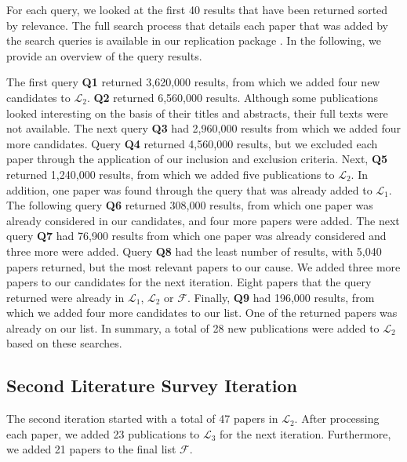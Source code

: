 For each query, we looked at the first 40 results that have been returned sorted by relevance. The full search process that details each paper that was added by the search queries is available in our replication package \cite{schneider_replication_2025}. In the following, we provide an overview of the query results.

The first query \textbf{Q1} returned 3,620,000 results, from which we added four new candidates to $\mathcal{L}_2$. \textbf{Q2} returned 6,560,000 results. Although some publications looked interesting on the basis of their titles and abstracts, their full texts were not available. The next query \textbf{Q3} had 2,960,000 results from which we added four more candidates. Query \textbf{Q4} returned 4,560,000 results, but we excluded each paper through the application of our inclusion and exclusion criteria. Next, \textbf{Q5} returned 1,240,000 results, from which we added five publications to $\mathcal{L}_2$. In addition, one paper was found through the query that was already added to $\mathcal{L}_1$. The following query \textbf{Q6} returned 308,000 results, from which one paper was already considered in our candidates, and four more papers were added. The next query \textbf{Q7} had 76,900 results from which one paper was already considered and three more were added. Query \textbf{Q8} had the least number of results, with 5,040 papers returned, but the most relevant papers to our cause. We added three more papers to our candidates for the next iteration. Eight papers that the query returned were already in $\mathcal{L}_1$, $\mathcal{L}_2$ or $\mathcal{F}$. Finally, \textbf{Q9} had 196,000 results, from which we added four more candidates to our list. One of the returned papers was already on our list. In summary, a total of 28 new publications were added to $\mathcal{L}_2$ based on these searches.

\subsection{Second Literature Survey Iteration}

The second iteration started with a total of 47 papers in $\mathcal{L}_2$. After processing each paper, we added 23 publications to $\mathcal{L}_3$ for the next iteration. Furthermore, we added 21 papers to the final list $\mathcal{F}$.

